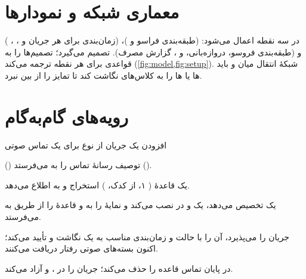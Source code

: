\documentclass[11pt,a4paper]{article}
\begin{document}
\section{معماری شبکه و نمودارها}
 در سه نقطه اعمال می‌شود:  (طبقه‌بندی فراسو و )،  (زمان‌بندی برای هر جریان  و
، ، ) و  (طبقه‌بندی فروسو، دروازه‌بانی،  و ، گزارش مصرف).  تصمیم
می‌گیرد؛  تصمیم‌ها را به قواعدی برای هر نقطه ترجمه می‌کند (\cref{fig:model,fig:setup}). شبکهٔ انتقال میان  و  باید
ها یا ها را به کلاس‌های  نگاشت کند تا تمایز را از بین نبرد.

\section{رویه‌های گام‌به‌گام}

\begin{procedurebox}{افزودن یک جریان  از نوع  برای یک تماس صوتی}\label{proc:gbr}
\begin{steps}
  \item {} () توصیف رسانهٔ تماس را به  می‌فرستد ().
  \item {} یک قاعدهٔ  ( ۱،  از کدک، ) استخراج و به  اطلاع می‌دهد.
  \item {} یک  تخصیص می‌دهد، یک  و  در  نصب می‌کند و نمایهٔ  را به  و قاعدهٔ
         را از طریق  به  می‌فرستد.
  \item {} جریان را می‌پذیرد، آن را با حالت  و زمان‌بندی مناسب به یک  نگاشت و تأیید می‌کند؛ اکنون بسته‌های صوتی رفتار
         دریافت می‌کنند.
  \item در پایان تماس  قاعده را حذف می‌کند؛  جریان  را در ،  و  آزاد می‌کند.
\end{steps}
\end{procedurebox}
\end{document}
